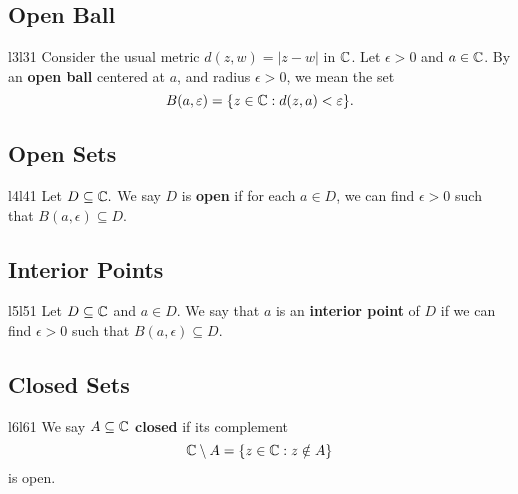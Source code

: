 \documentclass[a4paper]{article}
\begin{document}
\subsection*{Open Ball}
\begin{ocg}{l3}{l3}{1}
  Consider the usual metric \( d(z,w) = | z - w  |   \) in \( \mathbb{C}  \). Let \( \epsilon > 0  \) and \( a \in \mathbb{C}  \). By an \textbf{open ball} centered at \( a  \), and radius \( \epsilon > 0  \), we mean the set
  \[ B(a,\varepsilon)  =  \{ z \in \mathbb{C} : d(z,a) < \varepsilon \}. \]
\end{ocg}
\newline
{}

\subsection*{Open Sets}

\begin{ocg}{l4}{l4}{1}
   Let \( D \subseteq  \mathbb{C} .  \) We say \( D  \) is \textbf{open} if for each \( a \in D  \), we can find \( \epsilon > 0  \) such that  
   \(  B(a,\epsilon) \subseteq D  \).
\end{ocg}
\newline
{}

\subsection*{Interior Points}

\begin{ocg}{l5}{l5}{1}
  Let \( D \subseteq \mathbb{C} \) and \( a \in D  \). We say that \( a  \) is an \textbf{interior point} of \( D  \) if we can find \( \epsilon > 0  \) such that \( B(a, \epsilon) \subseteq  D  \).
\end{ocg}
\newline
{}

\subsection*{Closed Sets}

\begin{ocg}{l6}{l6}{1}
    We say \( A \subseteq \mathbb{C}   \) \textbf{closed} if its complement     
    \[  \mathbb{C} \setminus  A = \{ z \in \mathbb{C} : z \notin A  \}   \] is open.
\end{ocg}
\newline
{}
\end{document}

